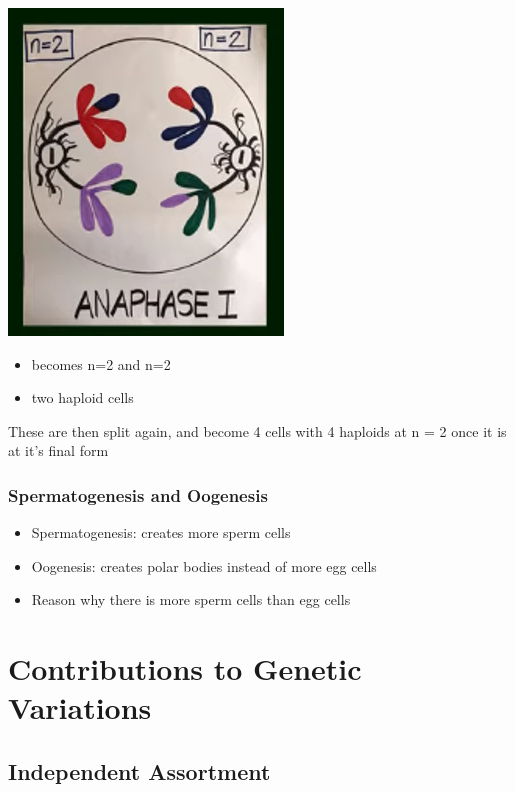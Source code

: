 \documentclass{article}
\begin{document}
\includegraphics*[scale=0.9]{aim.png}
\begin{itemize}
    \item becomes n=2 and n=2
    \item two haploid cells
\end{itemize}
These are then split again, and become 4 cells with 4 haploids at n = 2 once it is at it's final form
\subsubsection*{Spermatogenesis and Oogenesis}
\begin{itemize}
    \item Spermatogenesis: creates more sperm cells
    \item Oogenesis: creates polar bodies instead of more egg cells
    \item Reason why there is more sperm cells than egg cells
\end{itemize}
\section*{Contributions to Genetic Variations}
\subsection*{Independent Assortment}
\end{document}
